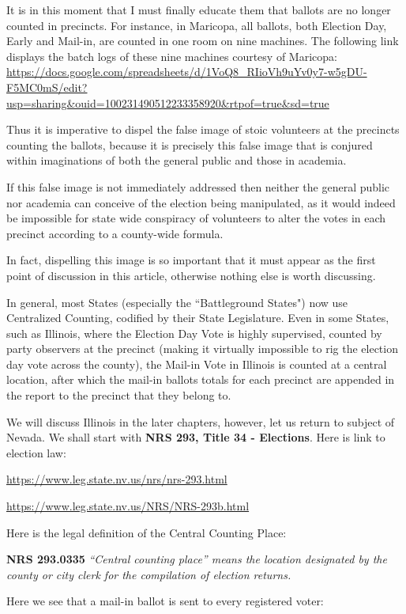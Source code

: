 \documentclass[preprint,13pt]{elsarticle}
\begin{document}
It is in this moment that I must finally educate them that ballots are no longer counted in precincts. For instance, in Maricopa, all ballots, both Election Day, Early and Mail-in, are counted in one room on nine machines. The following link displays the batch logs of these nine machines courtesy of Maricopa: \url{https://docs.google.com/spreadsheets/d/1VoQ8_RIioVh9uYv0y7-w5gDU-F5MC0mS/edit?usp=sharing&ouid=100231490512233358920&rtpof=true&sd=true}

Thus it is imperative to dispel the false image of stoic volunteers at the precincts counting the ballots, because it is precisely this false image that is conjured within imaginations of both the general public and those in academia.

If this false image is not immediately addressed then neither the general public nor academia can conceive of the election being manipulated, as it would indeed be impossible for state wide conspiracy of volunteers to alter the votes in each precinct according to a county-wide formula.

In fact, dispelling this image is so important that it must appear as the first point of discussion in this article, otherwise nothing else is worth discussing.

In general, most States (especially the ``Battleground States") now use Centralized Counting, codified by their State Legislature. Even in some States, such as Illinois, where the Election Day Vote is highly supervised, counted by party observers at the precinct (making it virtually impossible to rig the election day vote across the county), the Mail-in Vote in Illinois is counted at a central location, after which the mail-in ballots totals for each precinct are appended in the report to the precinct that they belong to.

We will discuss Illinois in the later chapters, however, let us return to subject of Nevada. We shall start with \textbf{NRS 293, Title 34 - Elections}. Here is link to election law: 

\url{https://www.leg.state.nv.us/nrs/nrs-293.html}

\url{https://www.leg.state.nv.us/NRS/NRS-293b.html}

Here is the legal definition of the Central Counting Place:

\textbf{NRS 293.0335} \textit{``Central counting place” means the location designated by the county or city clerk for the compilation of election returns.}

Here we see that a mail-in ballot is sent to every registered voter:
\end{document}
